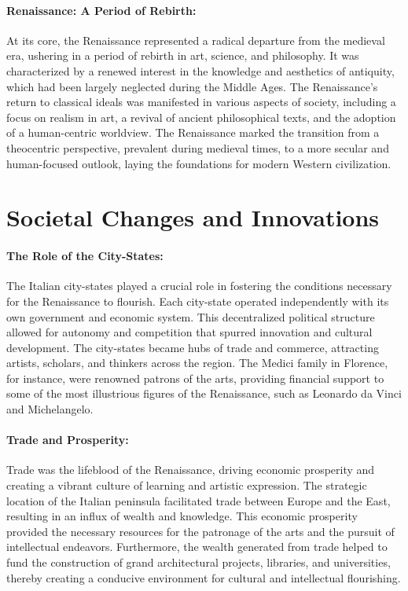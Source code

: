 \documentclass[a4paper,12pt]{book}
\begin{document}
\paragraph{Renaissance: A Period of Rebirth:}
At its core, the Renaissance represented a radical departure from the medieval era, ushering in a period of rebirth in art, science, and philosophy. It was characterized by a renewed interest in the knowledge and aesthetics of antiquity, which had been largely neglected during the Middle Ages. The Renaissance's return to classical ideals was manifested in various aspects of society, including a focus on realism in art, a revival of ancient philosophical texts, and the adoption of a human-centric worldview. The Renaissance marked the transition from a theocentric perspective, prevalent during medieval times, to a more secular and human-focused outlook, laying the foundations for modern Western civilization.

\section*{Societal Changes and Innovations}

\paragraph{The Role of the City-States:}
The Italian city-states played a crucial role in fostering the conditions necessary for the Renaissance to flourish. Each city-state operated independently with its own government and economic system. This decentralized political structure allowed for autonomy and competition that spurred innovation and cultural development. The city-states became hubs of trade and commerce, attracting artists, scholars, and thinkers across the region. The Medici family in Florence, for instance, were renowned patrons of the arts, providing financial support to some of the most illustrious figures of the Renaissance, such as Leonardo da Vinci and Michelangelo.

\paragraph{Trade and Prosperity:}
Trade was the lifeblood of the Renaissance, driving economic prosperity and creating a vibrant culture of learning and artistic expression. The strategic location of the Italian peninsula facilitated trade between Europe and the East, resulting in an influx of wealth and knowledge. This economic prosperity provided the necessary resources for the patronage of the arts and the pursuit of intellectual endeavors. Furthermore, the wealth generated from trade helped to fund the construction of grand architectural projects, libraries, and universities, thereby creating a conducive environment for cultural and intellectual flourishing.
\end{document}
